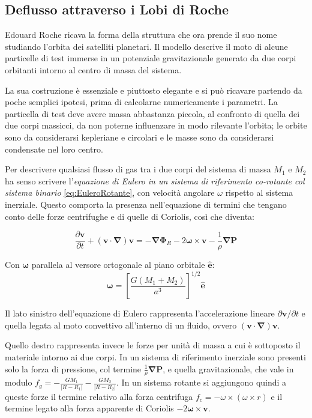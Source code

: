 \documentclass[a4paperbi]{article}
\begin{document}
\subsection{Deflusso attraverso i Lobi di Roche}
	Edouard Roche ricava la forma della struttura che ora prende il suo nome studiando l'orbita dei satelliti planetari. Il modello descrive il moto di alcune particelle di test immerse in un potenziale gravitazionale generato da due corpi orbitanti intorno al centro di massa del sistema.
	
	La sua costruzione è essenziale e piuttosto elegante e si può ricavare partendo da poche semplici ipotesi, prima di calcolarne numericamente i parametri. La particella di test deve avere massa abbastanza piccola, al confronto di quella dei due corpi massicci, da non poterne influenzare in modo rilevante l'orbita; le orbite sono da considerarsi kepleriane e circolari e le masse sono da considerarsi condensate nel loro centro.
	
	Per descrivere qualsiasi flusso di gas tra i due corpi del sistema di massa $M_1$ e $M_2$ ha senso scrivere l'\textit{equazione di Eulero in un sistema di riferimento co-rotante col sistema binario} \eqref{eq:EuleroRotante}, con velocità angolare $\omega$ rispetto al sistema inerziale. Questo comporta la presenza nell'equazione di termini che tengano conto delle forze centrifughe e di quelle di Coriolis, così che diventa:
	
	\begin{equation}\label{eq:EuleroRotante}
		\frac{\partial \bm{v}}{\partial t}+(\bm{v}\cdot\bm{\nabla})\bm{v}=-\bm{\nabla}\bm{\Phi}_R-2\bm{\omega}\times\bm{v}-\frac{1}{\rho}\bm{\nabla}\bm{P}
	\end{equation}
	
	Con $\bm{\omega}$ parallela al versore ortogonale al piano orbitale $\bm{\hat{e}}$:
	\begin{equation}
		\bm{\omega}=\left[\frac{G(M_1+M_2)}{a^3}\right]^{1/2}\bm{\hat{e}}
	\end{equation}
		
	Il lato sinistro dell'equazione di Eulero rappresenta l'accelerazione lineare $\partial \bm{v}/\partial t$ e quella legata al moto convettivo all'interno di un fluido, ovvero $(\bm{v}\cdot\bm{\nabla})\bm{v}$. 
	
	Quello destro rappresenta invece le forze per unità di massa a cui è sottoposto il materiale intorno ai due corpi. In un sistema di riferimento inerziale sono presenti solo la forza di pressione, col termine $\frac{1}{\rho}\bm{\nabla}\bm{P}$, e quella gravitazionale, che vale in modulo $f_g=-\frac{GM_1}{|R-R_1|}-\frac{GM_2}{|R-R_2|}$. In un sistema rotante si aggiungono quindi a queste forze il termine relativo alla forza centrifuga $f_c=-\omega\times(\omega\times r)$ e il termine legato alla forza apparente di Coriolis $-2\bm{\omega}\times\bm{v}$.
	
\end{document}
